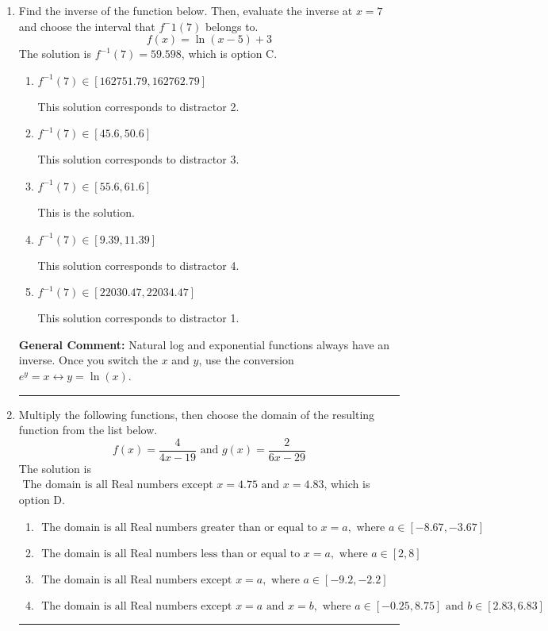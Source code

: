 \documentclass{extbook}[14pt]
\newcommand{\litem}[1]{\item #1

\rule{\textwidth}{0.4pt}}
\begin{document}
\begin{enumerate}\litem{
Find the inverse of the function below. Then, evaluate the inverse at $x = 7$ and choose the interval that $f^-1(7)$ belongs to.
\[ f(x) = \ln{(x-5)}+3 \]The solution is \( f^{-1}(7) = 59.598 \), which is option C.\begin{enumerate}[label=\Alph*.]
\item \( f^{-1}(7) \in [162751.79, 162762.79] \)

 This solution corresponds to distractor 2.
\item \( f^{-1}(7) \in [45.6, 50.6] \)

 This solution corresponds to distractor 3.
\item \( f^{-1}(7) \in [55.6, 61.6] \)

 This is the solution.
\item \( f^{-1}(7) \in [9.39, 11.39] \)

 This solution corresponds to distractor 4.
\item \( f^{-1}(7) \in [22030.47, 22034.47] \)

 This solution corresponds to distractor 1.
\end{enumerate}

\textbf{General Comment:} Natural log and exponential functions always have an inverse. Once you switch the $x$ and $y$, use the conversion $ e^y = x \leftrightarrow y=\ln(x)$.
}
\litem{
Multiply the following functions, then choose the domain of the resulting function from the list below.
\[ f(x) = \frac{4}{4x-19} \text{ and } g(x) = \frac{2}{6x-29} \]The solution is \( \text{ The domain is all Real numbers except } x = 4.75 \text{ and } x = 4.83 \), which is option D.\begin{enumerate}[label=\Alph*.]
\item \( \text{ The domain is all Real numbers greater than or equal to } x = a, \text{ where } a \in [-8.67, -3.67] \)


\item \( \text{ The domain is all Real numbers less than or equal to } x = a, \text{ where } a \in [2, 8] \)


\item \( \text{ The domain is all Real numbers except } x = a, \text{ where } a \in [-9.2, -2.2] \)


\item \( \text{ The domain is all Real numbers except } x = a \text{ and } x = b, \text{ where } a \in [-0.25, 8.75] \text{ and } b \in [2.83, 6.83] \)



\end{enumerate}}
\end{enumerate}
\end{document}
